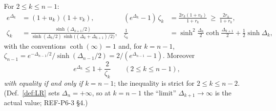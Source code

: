 \documentclass[11pt]{article}
\theoremstyle{definition}\newtheorem{example}[theorem]{Example}
\begin{document}
\begin{lemma}\label{lem:LRdata}
For $2\le k\le n-1$:
\begin{align}
 e^{\Delta_k}&=(1+u_k)(1+v_k), &
 (e^{\Delta_k}-1)\,\zeta_k&=\frac{2r_k(1+v_k)}{1+r_k}\ \ge\ \frac{2r_k}{1+r_k},
 \label{eq:LR1}\\
 \zeta_k&=\frac{\sinh(\Delta_{k+1}/2)}
 {\sinh(\Delta_k/2)\,\sinh\bigl((\Delta_k+\Delta_{k+1})/2\bigr)}, &
 \frac1{\zeta_k}&=\sinh^2\!\frac{\Delta_k}2\coth\frac{\Delta_{k+1}}2+\frac12\sinh\Delta_k,
 \label{eq:LR2}
\end{align}
with the conventions $\coth(\infty)=1$ and, for $k=n-1$,
$\zeta_{n-1}=e^{-\Delta_{n-1}/2}/\sinh(\Delta_{n-1}/2)=2/(e^{\Delta_{n-1}}-1)$.  Moreover
\begin{equation}\label{eq:LR3}
 e^{\Delta_k}\le1+\frac2{\zeta_k}\qquad(2\le k\le n-1),
\end{equation}
\emph{with equality if and only if $k=n-1$}; the inequality is strict for $2\le k\le n-2$.
(Def.~\ref{def:LR} sets $\Delta_n=+\infty$, so at $k=n-1$ the ``limit'' $\Delta_{k+1}\to\infty$
is the actual value; REF-P6-3 \S4.)
\end{lemma}
\end{document}
